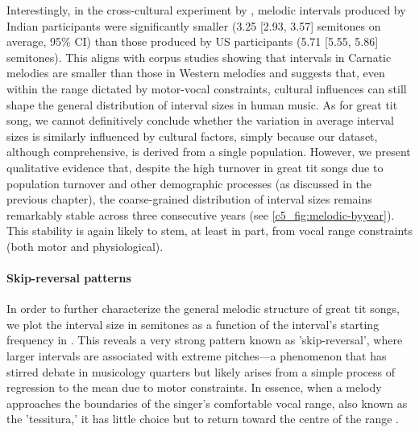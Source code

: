 Interestingly, in the cross-cultural experiment by \textcite{anglada-tort2023}, melodic intervals produced by Indian participants were significantly smaller (3.25 [2.93, 3.57] semitones on average, 95\% CI) than those produced by US participants (5.71 [5.55, 5.86] semitones). This aligns with corpus studies showing that intervals in Carnatic melodies are smaller than those in Western melodies \autocite{bowling2012} and suggests that, even within the range dictated by motor-vocal constraints, cultural influences can still shape the general distribution of interval sizes in human music. As for great tit song, we cannot definitively conclude whether the variation in average interval sizes is similarly influenced by cultural factors, simply because our dataset, although comprehensive, is derived from a single population. However, we present qualitative evidence that, despite the high turnover in great tit songs due to population turnover and other demographic processes (as discussed in the previous chapter), the coarse-grained distribution of interval sizes remains remarkably stable across three consecutive years (see \autoref{c5_fig:melodic-byyear}). This stability is again likely to stem, at least in part, from vocal range constraints (both motor and physiological).

\paragraph{Skip-reversal patterns}
In order to further characterize the general melodic structure of great tit songs, we plot the interval size in semitones as a function of the interval's starting frequency in . This reveals a very strong pattern known as 'skip-reversal', where larger intervals are associated with extreme pitches---a phenomenon that has stirred debate in musicology quarters \autocite{vonhippel2000} but likely arises from a simple process of regression to the mean due to motor constraints. In essence, when a melody approaches the boundaries of the singer's comfortable vocal range, also known as the 'tessitura,' it has little choice but to return toward the centre of the range \autocite{tierney2008, vonhippel2000, vonhippel2000a}. 

